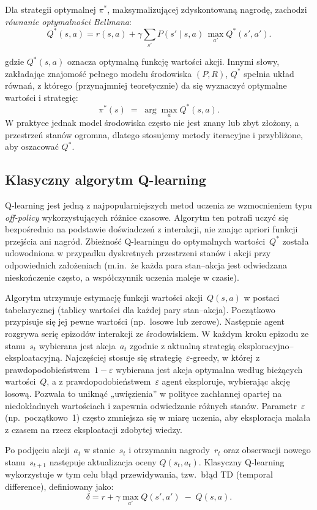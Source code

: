 \documentclass[a4paper,12pt]{article}
\begin{document}
Dla strategii optymalnej \(\pi^*\), maksymalizującej zdyskontowaną nagrodę, zachodzi \emph{równanie optymalności Bellmana}:
\[
Q^*(s,a)
= r(s,a) + \gamma \sum_{s'} P(s'\mid s,a)\,\max_{a'} Q^*(s',a').
\]

gdzie \(Q^*(s,a)\) oznacza optymalną funkcję wartości akcji. Innymi słowy, zakładając znajomość pełnego modelu środowiska \((P,R)\), \(Q^*\) spełnia układ równań, z którego (przynajmniej teoretycznie) da się wyznaczyć optymalne wartości i strategię:
\[
\pi^*(s) \;=\; \arg\max_{a} Q^*(s,a).
\]
W praktyce jednak model środowiska często nie jest znany lub zbyt złożony, a przestrzeń stanów ogromna, dlatego stosujemy metody iteracyjne i przybliżone, aby oszacować \(Q^*\).

\subsection{Klasyczny algorytm Q-learning}

Q-learning jest jedną z najpopularniejszych metod uczenia ze wzmocnieniem typu \emph{off-policy} wykorzystujących różnice czasowe. Algorytm ten potrafi uczyć się bezpośrednio na podstawie doświadczeń z interakcji, nie znając apriori funkcji przejścia ani nagród. Zbieżność Q-learningu do optymalnych wartości~$Q^*$ została udowodniona w przypadku dyskretnych przestrzeni stanów i akcji przy odpowiednich założeniach (m.in.\ że każda para stan–akcja jest odwiedzana nieskończenie często, a współczynnik uczenia maleje w czasie).

Algorytm utrzymuje estymację funkcji wartości akcji~$Q(s,a)$ w postaci tabelarycznej (tablicy wartości dla każdej pary stan–akcja). Początkowo przypisuje się jej pewne wartości (np.\ losowe lub zerowe). Następnie agent rozgrywa serię epizodów interakcji ze środowiskiem. W każdym kroku epizodu ze stanu~$s_t$ wybierana jest akcja~$a_t$ zgodnie z aktualną strategią eksploracyjno–eksploatacyjną. Najczęściej stosuje się strategię~$\varepsilon$-greedy, w której z prawdopodobieństwem~$1-\varepsilon$ wybierana jest akcja optymalna według bieżących wartości~$Q$, a z prawdopodobieństwem~$\varepsilon$ agent eksploruje, wybierając akcję losową. Pozwala to uniknąć „uwięzienia” w polityce zachłannej opartej na niedokładnych wartościach i zapewnia odwiedzanie różnych stanów. Parametr~$\varepsilon$ (np.\ początkowo~1) często zmniejsza się w miarę uczenia, aby eksploracja malała z czasem na rzecz eksploatacji zdobytej wiedzy.

Po podjęciu akcji~$a_t$ w stanie~$s_t$ i otrzymaniu nagrody~$r_t$ oraz obserwacji nowego stanu~$s_{t+1}$ następuje aktualizacja oceny $Q(s_t,a_t)$. Klasyczny Q-learning wykorzystuje w tym celu błąd przewidywania, tzw.\ błąd TD (temporal difference), definiowany jako:
\[
\delta = r + \gamma \max_{a'} Q(s',a') \;-\; Q(s,a).
\]
\end{document}
